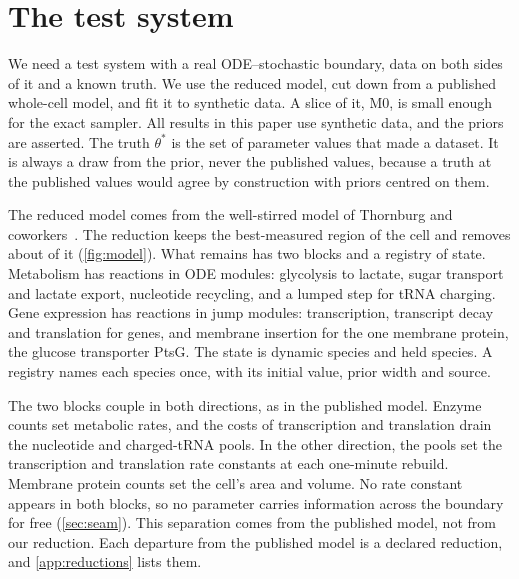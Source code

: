 \section{The test system}
\label{sec:model}

We need a test system with a real ODE--stochastic boundary, data on both sides of it and a
known truth. We use the reduced \syn{} model, cut down from a published whole-cell model, and
fit it to synthetic data. A slice of it, M0, is small enough for the exact sampler. All results
in this paper use synthetic data, and the priors are asserted. The truth $\theta^\ast$ is the
set of parameter values that made a dataset. It is always a draw from the prior, never the
published values, because a truth at the published values would agree by construction with
priors centred on them.

The reduced \syn{} model comes from the well-stirred \syn{} model of Thornburg and
coworkers~\cite{thornburg2022fundamental}. The reduction keeps the best-measured region of the
cell and removes about  of it (\cref{fig:model}). What remains has two
blocks and a registry of state.
Metabolism has  reactions in  ODE modules: glycolysis to
lactate, sugar transport and lactate export, nucleotide recycling, and a lumped step for tRNA
charging. Gene expression has  reactions in  jump
modules: transcription, transcript decay and translation for  genes, and
membrane insertion for the one membrane protein, the glucose transporter PtsG. The state is
 dynamic species and  held species. A registry names
each species once, with its initial value, prior width and source.

The two blocks couple in both directions, as in the published model. Enzyme counts
set metabolic rates, and the costs of transcription and translation drain the
nucleotide and charged-tRNA pools. In the other direction, the pools set the
transcription and translation rate constants at each one-minute rebuild. Membrane
protein counts set the cell's area and volume. No rate constant appears in both
blocks, so no parameter carries information across the boundary for free
(\cref{sec:seam}). This separation comes from the published model, not from our reduction.
Each departure from the published model is a declared reduction, and
\cref{app:reductions} lists them.

